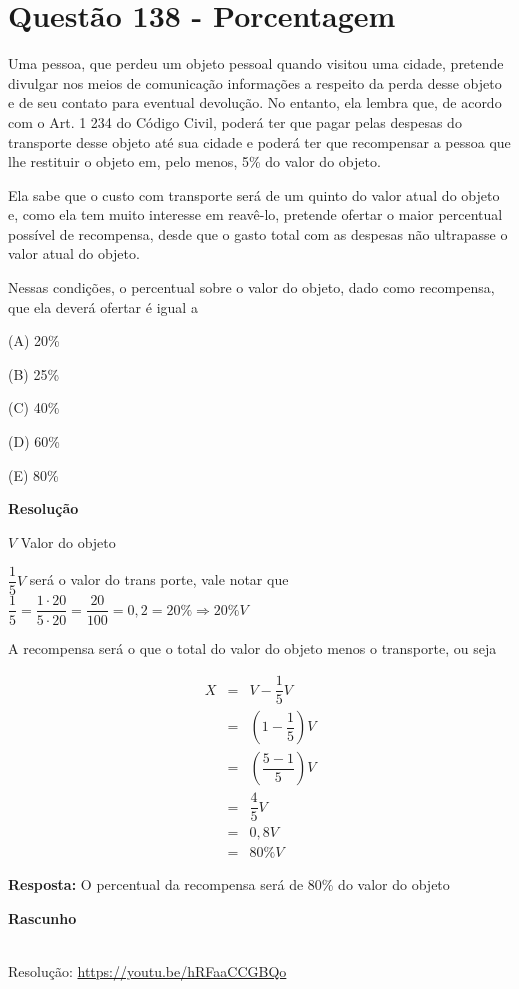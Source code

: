\section{Questão 138 - Porcentagem}

Uma pessoa, que perdeu um objeto pessoal quando visitou uma cidade, pretende divulgar nos meios de comunicação informações a respeito da perda desse objeto e de seu contato para eventual devolução. 
No entanto, ela lembra que, de acordo com o Art. 1 234 do Código Civil, poderá ter que pagar pelas despesas do transporte desse objeto até sua cidade e poderá ter que recompensar a pessoa que lhe restituir o objeto em, pelo menos, 5\% do valor do objeto. 

Ela sabe que o custo com transporte será de um quinto do valor atual do objeto e, como ela tem muito interesse em reavê-lo, pretende ofertar o maior percentual possível de recompensa, desde que o gasto total com as despesas não ultrapasse o valor atual do objeto.

Nessas condições, o percentual sobre o valor do objeto, dado como recompensa, que ela deverá ofertar é igual a

(A) 20\%

(B) 25\%

(C) 40\%

(D) 60\%

(E) 80\%

\textbf{Resolução}

$ V $ Valor do objeto

$ \dfrac{1}{5}V $ será o valor do trans porte, vale notar que $ \dfrac{1}{5} =  \dfrac{1 \cdot 20}{5 \cdot 20} = \dfrac{20}{100} = 0,2 = 20\% \Rightarrow 20\%V $

A recompensa será o que o total do valor do objeto menos o transporte, ou seja


\begin{eqnarray*}
    X &=& V - \dfrac{1}{5}V \\
      &=& \left(1 - \dfrac{1}{5}\right)V \\
      &=& \left(\dfrac{5 - 1}{5}\right)V \\
      &=& \dfrac{4}{5}V \\
      &=& 0,8V \\
      &=& 80\%V 
\end{eqnarray*}

\textbf{Resposta:} O percentual da recompensa será de 80\% do valor do objeto

\textbf{Rascunho}




\begin{center}
    \href{https://youtu.be/hRFaaCCGBQo}{
    }\\
    {\scriptsize Resolução: \url{https://youtu.be/hRFaaCCGBQo}}
\end{center}